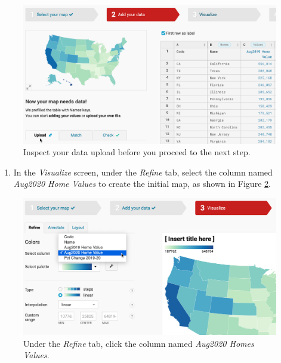 \documentclass[
  english,
]{book}
\providecommand{\tightlist}{%
  \setlength{\itemsep}{0pt}\setlength{\parskip}{0pt}}
\begin{document}
\begin{figure}
\includegraphics[width=600px]{images/07-map/datawrapper-upload-review} \caption{Inspect your data upload before you proceed to the next step.}\label{fig:datawrapper-upload-review}
\end{figure}

\begin{enumerate}
\def\labelenumi{\arabic{enumi}.}
\setcounter{enumi}{6}
\tightlist
\item
  In the \emph{Visualize} screen, under the \emph{Refine} tab, select the column named \emph{Aug2020 Home Values} to create the initial map, as shown in Figure \ref{fig:datawrapper-select-column}.
\end{enumerate}



\begin{figure}
\includegraphics[width=600px]{images/07-map/datawrapper-select-column} \caption{Under the \emph{Refine} tab, click the column named \emph{Aug2020 Homes Values}.}\label{fig:datawrapper-select-column}
\end{figure}
\end{document}
